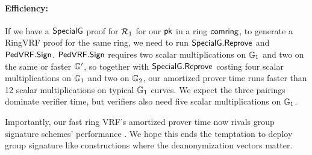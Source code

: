 \paragraph{Efficiency:} If we have a ${\mathsf{SpecialG}}$ proof for $\mathcal{R}_1$ for our $\mathsf{pk}$ in a ring $\mathsf{comring}$, to generate a RingVRF proof for the same ring, we need to run ${\mathsf{SpecialG}}.{\mathsf{Reprove}}$ and ${\mathsf{PedVRF}}.{\mathsf{Sign}}$. ${\mathsf{PedVRF}}.{\mathsf{Sign}}$ requires two scalar multiplications on ${\mathbb{G}}_1$
 and two on the same or faster ${\mathbb{G}}'$,
so together with ${\mathsf{SpecialG}}.{\mathsf{Reprove}}$ costing four scalar multiplications
on ${\mathbb{G}}_1$ and two on ${\mathbb{G}}_2$, our amortized prover time
 runs faster than 12 scalar multiplications on typical ${\mathbb{G}}_1$ curves. 
We expect the three pairings dominate verifier time, but
 verifiers also need five scalar multiplications on ${\mathbb{G}}_1$.

Importantly, our fast ring VRF's amortized prover time now rivals
group signature schemes' performance \cite{group_sig_survey}.
We hope this ends the temptation to deploy group signature like
 constructions where the deanonymization vectors matter. 


